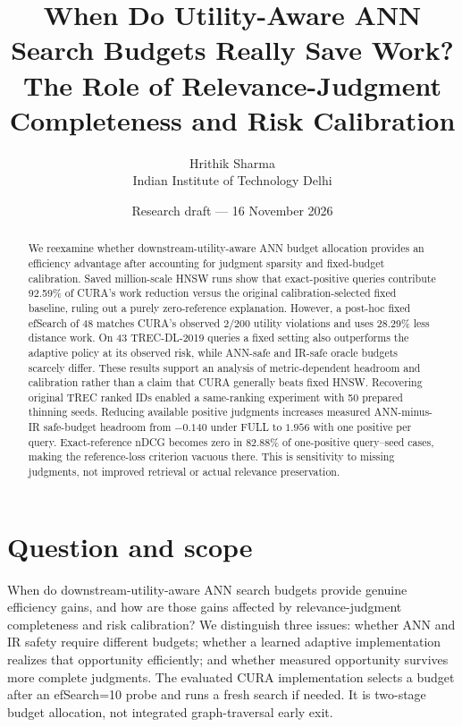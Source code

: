\documentclass[10pt,twocolumn]{article}
\title{When Do Utility-Aware ANN Search Budgets Really Save Work?\\
\large The Role of Relevance-Judgment Completeness and Risk Calibration}
\author{Hrithik Sharma\\Indian Institute of Technology Delhi}
\date{Research draft --- 16 November 2026}
\begin{document}
\maketitle
\begin{abstract}
We reexamine whether downstream-utility-aware ANN budget allocation provides an efficiency advantage after accounting for judgment sparsity and fixed-budget calibration.
Saved million-scale HNSW runs show that exact-positive queries contribute 92.59\% of CURA's work reduction versus the original calibration-selected fixed baseline, ruling out a purely zero-reference explanation.
However, a post-hoc fixed efSearch of 48 matches CURA's observed 2/200 utility violations and uses 28.29\% less distance work. On 43 TREC-DL-2019 queries a fixed setting also outperforms the adaptive policy at its observed risk, while ANN-safe and IR-safe oracle budgets scarcely differ.
These results support an analysis of metric-dependent headroom and calibration rather than a claim that CURA generally beats fixed HNSW.
Recovering original TREC ranked IDs enabled a same-ranking experiment with 50 prepared thinning seeds. Reducing available positive judgments increases measured ANN-minus-IR safe-budget headroom from $-0.140$ under FULL to $1.956$ with one positive per query. Exact-reference nDCG becomes zero in 82.88\% of one-positive query--seed cases, making the reference-loss criterion vacuous there. This is sensitivity to missing judgments, not improved retrieval or actual relevance preservation.
\end{abstract}

\section{Question and scope}
When do downstream-utility-aware ANN search budgets provide genuine efficiency gains, and how are those gains affected by relevance-judgment completeness and risk calibration?
We distinguish three issues: whether ANN and IR safety require different budgets; whether a learned adaptive implementation realizes that opportunity efficiently; and whether measured opportunity survives more complete judgments.
The evaluated CURA implementation selects a budget after an efSearch=10 probe and runs a fresh search if needed. It is two-stage budget allocation, not integrated graph-traversal early exit.
\end{document}

